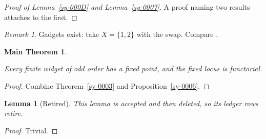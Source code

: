 \documentclass{amsart}
\providecommand{\uses}[1]{}
\theoremstyle{plain}
\newtheorem{lemma}[theorem]{Lemma}
\newtheorem*{mainthm}{Main Theorem}
\theoremstyle{definition}
\theoremstyle{remark}
\newtheorem{remark}[theorem]{Remark}
\begin{document}

\begin{proof}[Proof of Lemma~\ref{sy-000D} and Lemma~\ref{sy-0007}]
A proof naming two results attaches to the first.
\end{proof}

\begin{remark}\label{sy-000A}
Gadgets exist: take $X = \{1,2\}$ with the swap. Compare \cite[Theorem 2.1]{Kre99}.
\end{remark}


\begin{mainthm}\label{sy-000B}
\uses{sy-0003, sy-0006}
Every finite widget of odd order has a fixed point, and the fixed locus is functorial.
\end{mainthm}
\begin{proof}
Combine Theorem~\ref{sy-0003} and Proposition~\ref{sy-0006}.
\end{proof}


\begin{lemma}[Retired]\label{sy-000F}
This lemma is accepted and then deleted, so its ledger rows retire.
\end{lemma}
\begin{proof}
Trivial.
\end{proof}



\end{document}
